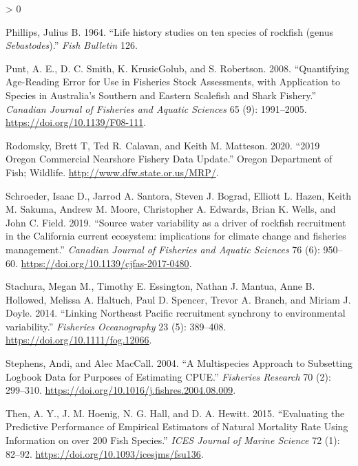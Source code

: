 \documentclass[11pt,
  english,
  a4paper,
]{article}
\newlength{\cslhangindent}
\newenvironment{CSLReferences}[2] %
 {%
  \setlength{\parindent}{0pt}
  \ifodd #1 \everypar{\setlength{\hangindent}{\cslhangindent}}\ignorespaces\fi
  \ifnum #2 > 0
  \setlength{\parskip}{#2\baselineskip}
  \fi
 }%
 {}
\begin{document}
\begin{CSLReferences}{1}{0}
\leavevmode\hypertarget{ref-Phillips1964}{}%
Phillips, Julius B. 1964. {``{Life history studies on ten species of rockfish (genus \emph{Sebastodes})}.''} \emph{Fish Bulletin} 126.

\leavevmode\hypertarget{ref-punt_quantifying_2008}{}%
Punt, A. E., D. C. Smith, K. KrusicGolub, and S. Robertson. 2008. {``Quantifying Age-Reading Error for Use in Fisheries Stock Assessments, with Application to Species in {A}ustralia's Southern and Eastern Scalefish and Shark Fishery.''} \emph{Canadian Journal of Fisheries and Aquatic Sciences} 65 (9): 1991--2005. \url{https://doi.org/10.1139/F08-111}.

\leavevmode\hypertarget{ref-rodomsky_2019_2020}{}%
Rodomsky, Brett T, Ted R. Calavan, and Keith M. Matteson. 2020. {``2019 Oregon Commercial Nearshore Fishery Data Update.''} Oregon Department of Fish; Wildlife. \url{http://www.dfw.state.or.us/MRP/}.

\leavevmode\hypertarget{ref-Schroeder2019}{}%
Schroeder, Isaac D., Jarrod A. Santora, Steven J. Bograd, Elliott L. Hazen, Keith M. Sakuma, Andrew M. Moore, Christopher A. Edwards, Brian K. Wells, and John C. Field. 2019. {``{Source water variability as a driver of rockfish recruitment in the California current ecosystem: implications for climate change and fisheries management}.''} \emph{Canadian Journal of Fisheries and Aquatic Sciences} 76 (6): 950--60. \url{https://doi.org/10.1139/cjfas-2017-0480}.

\leavevmode\hypertarget{ref-Stachura2014}{}%
Stachura, Megan M., Timothy E. Essington, Nathan J. Mantua, Anne B. Hollowed, Melissa A. Haltuch, Paul D. Spencer, Trevor A. Branch, and Miriam J. Doyle. 2014. {``{Linking Northeast Pacific recruitment synchrony to environmental variability}.''} \emph{Fisheries Oceanography} 23 (5): 389--408. \url{https://doi.org/10.1111/fog.12066}.

\leavevmode\hypertarget{ref-stephens_multispecies_2004}{}%
Stephens, Andi, and Alec MacCall. 2004. {``A Multispecies Approach to Subsetting Logbook Data for Purposes of Estimating {CPUE}.''} \emph{Fisheries Research} 70 (2): 299--310. \url{https://doi.org/10.1016/j.fishres.2004.08.009}.

\leavevmode\hypertarget{ref-then_evaluating_2015-1}{}%
Then, A. Y., J. M. Hoenig, N. G. Hall, and D. A. Hewitt. 2015. {``Evaluating the Predictive Performance of Empirical Estimators of Natural Mortality Rate Using Information on over 200 Fish Species.''} \emph{ICES Journal of Marine Science} 72 (1): 82--92. \url{https://doi.org/10.1093/icesjms/fsu136}.


\end{CSLReferences}
\end{document}
